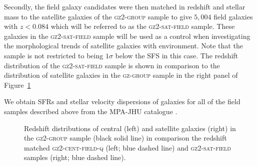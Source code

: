 Secondly, the field galaxy candidates were then matched in redshift and stellar mass to the satellite galaxies of the \textsc{gz2-group} sample to give $5, 004$ field galaxies with $z < 0.084$ which will be referred to as the \textsc{gz2-sat-field} sample. These galaxies in the \textsc{gz2-sat-field} sample will be used as a control when investigating the morphological trends of satellite galaxies with environment. Note that the sample is not restricted to being $1\sigma$ below the SFS in this case. The redshift distribution of the \textsc{gz2-sat-field} sample is shown in comparison to the distribution of satellite galaxies in the \textsc{gz-group} sample in the right panel of Figure~\ref{fig:zcompare}

We obtain SFRs and stellar velocity dispersions of galaxies for all of the field samples described above from the MPA-JHU catalogue \citep{kauffmann03, brinchmann04}. 

\begin{figure}
\caption{Redshift distributions of central (left) and satellite galaxies (right) in the \textsc{gz2-group} sample (black solid line) in comparison the redshift matched \textsc{gz2-cent-field-q} (left; blue dashed line) and \textsc{gz2-sat-field} samples (right; blue dashed line).}
\label{fig:zcompare}
\end{figure}

